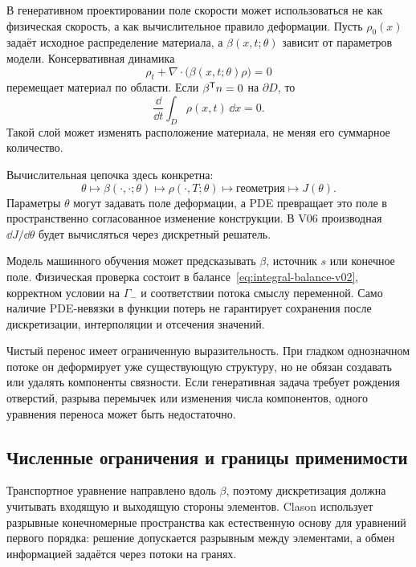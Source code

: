 В генеративном проектировании поле скорости может использоваться не как физическая скорость, а как вычислительное правило деформации. Пусть $\rho_0(x)$ задаёт исходное распределение материала, а $\beta(x,t;\theta)$ зависит от параметров модели. Консервативная динамика
\begin{equation}
\label{eq:design-density-transport-v02}
\rho_t
+
\nabla\cdot\bigl(\beta(x,t;\theta)\rho\bigr)
=0
\end{equation}
перемещает материал по области. Если $\beta^{\mathsf{T}}n=0$ на $\partial D$, то
\[
\frac{\dd}{\dd t}
\int_D\rho(x,t)\,\dd x
=0.
\]
Такой слой может изменять расположение материала, не меняя его суммарное количество.

Вычислительная цепочка здесь конкретна:
\[
\theta
\longmapsto
\beta(\cdot,\cdot;\theta)
\longmapsto
\rho(\cdot,T;\theta)
\longmapsto
\text{геометрия}
\longmapsto
J(\theta).
\]
Параметры $\theta$ могут задавать поле деформации, а PDE превращает это поле в пространственно согласованное изменение конструкции. В V06 производная $\dd J/\dd\theta$ будет вычисляться через дискретный решатель.

\begin{mlconnection}
Модель машинного обучения может предсказывать $\beta$, источник $s$ или конечное поле. Физическая проверка состоит в балансе~\eqref{eq:integral-balance-v02}, корректном условии на $\Gamma_-$ и соответствии потока смыслу переменной. Само наличие PDE-невязки в функции потерь не гарантирует сохранения после дискретизации, интерполяции и отсечения значений.
\end{mlconnection}

Чистый перенос имеет ограниченную выразительность. При гладком однозначном потоке он деформирует уже существующую структуру, но не обязан создавать или удалять компоненты связности. Если генеративная задача требует рождения отверстий, разрыва перемычек или изменения числа компонентов, одного уравнения переноса может быть недостаточно.

\subsection{Численные ограничения и границы применимости}

Транспортное уравнение направлено вдоль $\beta$, поэтому дискретизация должна учитывать входящую и выходящую стороны элементов. Clason использует разрывные конечномерные пространства как естественную основу для уравнений первого порядка: решение допускается разрывным между элементами, а обмен информацией задаётся через потоки на гранях.

